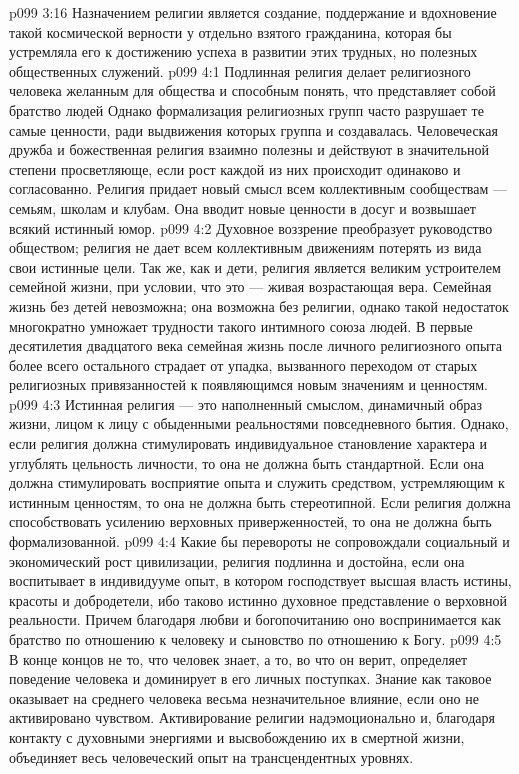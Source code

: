 \vs p099 3:16 Назначением религии является создание, поддержание и вдохновение такой космической верности у отдельно взятого гражданина, которая бы устремляла его к достижению успеха в развитии этих трудных, но полезных общественных служений.
\vs p099 4:1 Подлинная религия делает религиозного человека желанным для общества и способным понять, что представляет собой братство людей Однако формализация религиозных групп часто разрушает те самые ценности, ради выдвижения которых группа и создавалась. Человеческая дружба и божественная религия взаимно полезны и действуют в значительной степени просветляюще, если рост каждой из них происходит одинаково и согласованно. Религия придает новый смысл всем коллективным сообществам --- семьям, школам и клубам. Она вводит новые ценности в досуг и возвышает всякий истинный юмор.
\vs p099 4:2 Духовное воззрение преобразует руководство обществом; религия не дает всем коллективным движениям потерять из вида свои истинные цели. Так же, как и дети, религия является великим устроителем семейной жизни, при условии, что это --- живая возрастающая вера. Семейная жизнь без детей невозможна; она возможна без религии, однако такой недостаток многократно умножает трудности такого интимного союза людей. В первые десятилетия двадцатого века семейная жизнь после личного религиозного опыта более всего остального страдает от упадка, вызванного переходом от старых религиозных привязанностей к появляющимся новым значениям и ценностям.
\vs p099 4:3 \pc Истинная религия --- это наполненный смыслом, динамичный образ жизни, лицом к лицу с обыденными реальностями повседневного бытия. Однако, если религия должна стимулировать индивидуальное становление характера и углублять цельность личности, то она не должна быть стандартной. Если она должна стимулировать восприятие опыта и служить средством, устремляющим к истинным ценностям, то она не должна быть стереотипной. Если религия должна способствовать усилению верховных приверженностей, то она не должна быть формализованной.
\vs p099 4:4 Какие бы перевороты не сопровождали социальный и экономический рост цивилизации, религия подлинна и достойна, если она воспитывает в индивидууме опыт, в котором господствует высшая власть истины, красоты и добродетели, ибо таково истинно духовное представление о верховной реальности. Причем благодаря любви и богопочитанию оно воспринимается как братство по отношению к человеку и сыновство по отношению к Богу.
\vs p099 4:5 В конце концов не то, что человек знает, а то, во что он верит, определяет поведение человека и доминирует в его личных поступках. Знание как таковое оказывает на среднего человека весьма незначительное влияние, если оно не активировано чувством. Активирование религии надэмоционально и, благодаря контакту с духовными энергиями и высвобождению их в смертной жизни, объединяет весь человеческий опыт на трансцендентных уровнях.

